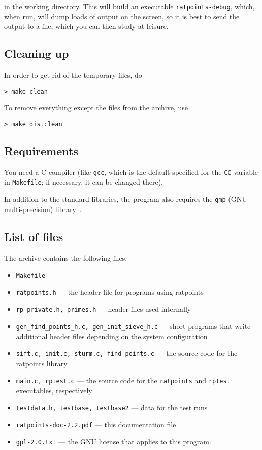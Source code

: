 \documentclass[12pt,a4paper,oneside]{amsart}
\begin{document}
in the working directory. This will build an executable \texttt{ratpoints-debug},
which, when run, will dump loads of output on the screen, so it is best
to send the output to a file, which you can then study at leisure.

\subsection{Cleaning up}

In order to get rid of the temporary files, do

\begin{verbatim}
> make clean
\end{verbatim}

To remove everything except the files from the archive, use

\begin{verbatim}
> make distclean
\end{verbatim}

\subsection{Requirements}

You need a C compiler (like \texttt{gcc}, which is the default specified
for the \texttt{CC} variable in \texttt{Makefile}; if necessary, it can be
changed there).

In addition to the standard libraries, the program also requires the
\texttt{gmp} (GNU multi-precision) library~\cite{gmp}.

\subsection{List of files}

The archive contains the following files.
\begin{itemize}
  \item \texttt{Makefile}
  \item \texttt{ratpoints.h} --- the header file for programs using ratpoints
  \item \texttt{rp-private.h, primes.h} --- header files used internally
  \item \texttt{gen\_find\_points\_h.c, gen\_init\_sieve\_h.c} ---
        short programs that write additional header files depending
        on the system configuration
  \item \texttt{sift.c, init.c, sturm.c, find\_points.c} ---
        the source code for the ratpoints library
  \item \texttt{main.c, rptest.c} --- the source code for the \texttt{ratpoints}
        and \texttt{rptest} executables, respectively
  \item \texttt{testdata.h, testbase, testbase2} --- data for the test runs
  \item \texttt{ratpoints-doc-2.2.pdf} --- this documentation file
  \item \texttt{gpl-2.0.txt} --- the GNU license that applies to this program.
\end{itemize}
\end{document}

